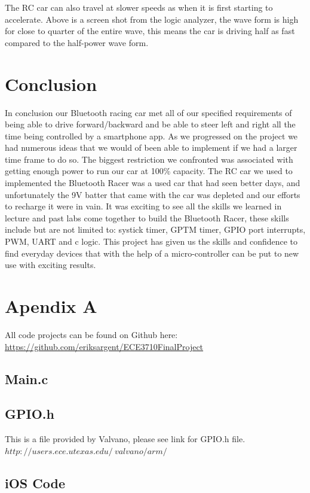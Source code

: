 \documentclass[12pt]{article}
\begin{document}
The RC car can also travel at slower speeds as when it is first starting to accelerate. Above is a screen shot from the logic analyzer, the wave form is high for close to quarter of the entire wave, this means the car is driving half as fast compared to the half-power wave form.\\

\section{Conclusion}
In conclusion our Bluetooth racing car met all of our specified requirements of being able to drive forward/backward and be able to steer left and right all the time being controlled by a smartphone app. As we progressed on the project we had numerous ideas that we would of been able to implement if we had a larger time frame to do so. The biggest restriction we confronted was associated with getting enough power to run our car at 100\% capacity. The RC car we used to implemented the Bluetooth Racer was a used car that had seen better days, and unfortunately the 9V batter that came with the car was depleted and our efforts to recharge it were in vain. It was exciting to see all the skills we learned in lecture and past labs come together to build the Bluetooth Racer, these skills include but are not limited to: systick timer, GPTM timer, GPIO port interrupts, PWM, UART and c logic. This project has given us the skills and confidence to find everyday devices that with the help of a micro-controller can be put to new use with exciting results.\\

\newpage
\section{Apendix A}

All code projects can be found on Github here: \url{https://github.com/eriksargent/ECE3710FinalProject}

\subsection{Main.c}


\subsection{GPIO.h}
This is a file provided by Valvano, please see link for GPIO.h file.\\
$http://users.ece.utexas.edu/~valvano/arm/$\\

\subsection{iOS Code}

\end{document}

